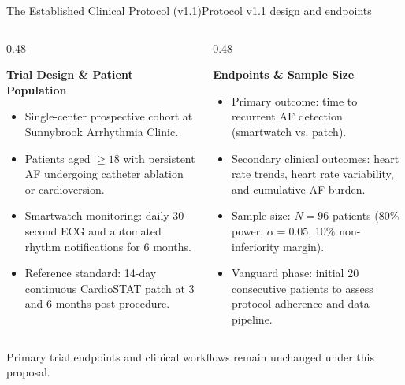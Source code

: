 \documentclass[aspectratio=169,10pt]{beamer}
\begin{document}
\begin{frame}{The Established Clinical Protocol (v1.1)}{Protocol v1.1 design and endpoints}
\begin{columns}[T]
  \begin{column}{0.48\textwidth}
    \begin{block}{\textbf{Trial Design \& Patient Population}}
      \scriptsize
      \begin{itemize}
        \setlength{\itemsep}{0.2em}
        \item Single-center prospective cohort at Sunnybrook Arrhythmia Clinic.
        \item Patients aged $\ge 18$ with persistent AF undergoing catheter ablation or cardioversion.
        \item Smartwatch monitoring: daily 30-second ECG and automated rhythm notifications for 6 months.
        \item Reference standard: 14-day continuous CardioSTAT patch at 3 and 6 months post-procedure.
      \end{itemize}
    \end{block}
  \end{column}
  \begin{column}{0.48\textwidth}
    \begin{block}{\textbf{Endpoints \& Sample Size}}
      \scriptsize
      \begin{itemize}
        \setlength{\itemsep}{0.2em}
        \item Primary outcome: time to recurrent AF detection (smartwatch vs. patch).
        \item Secondary clinical outcomes: heart rate trends, heart rate variability, and cumulative AF burden.
        \item Sample size: $N = 96$ patients (80\% power, $\alpha=0.05$, 10\% non-inferiority margin).
        \item Vanguard phase: initial 20 consecutive patients to assess protocol adherence and data pipeline.
      \end{itemize}
    \end{block}
  \end{column}
\end{columns}
\vspace{0.4em}
\centering
\scriptsize
{\color{NavyPrimary}Primary trial endpoints and clinical workflows remain unchanged under this proposal.}
\end{frame}
\end{document}
